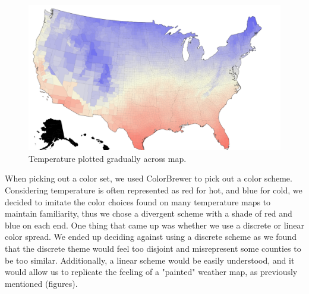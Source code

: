 \documentclass[10pt,twocolumn,twoside]{opticajnl}
\begin{document}
\begin{figure}
	\centering
	\includegraphics[scale=0.25]{images/tempMap.png}
	\caption{Temperature plotted gradually across map.}
\end{figure}

When picking out a color set, we used ColorBrewer \cite{colorbrewer} to pick out a color scheme. Considering temperature is often represented as red for hot, and blue for cold, we decided to imitate the color choices found on many temperature maps to maintain familiarity, thus we chose a divergent scheme with a shade of red and blue on each end. One thing that came up was whether we use a discrete or linear color spread. We ended up deciding against using a discrete scheme as we found that the discrete theme would feel too disjoint and misrepresent some counties to be too similar. Additionally, a linear scheme would be easily understood, and it would allow us to replicate the feeling of a "painted" weather map, as previously mentioned (figures).
\end{document}
